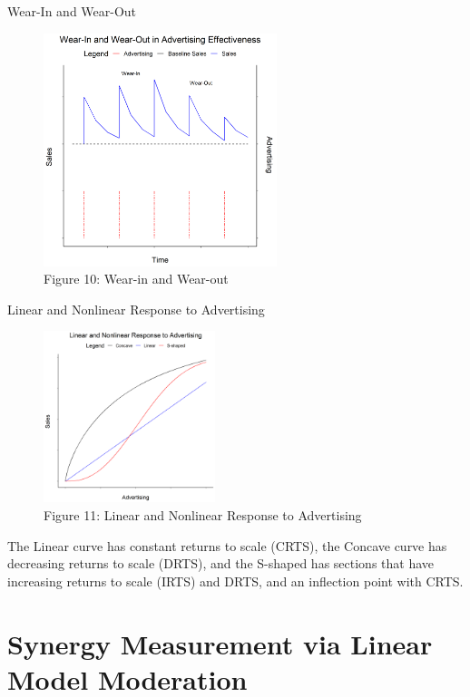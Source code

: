 \documentclass[pdf]{beamer}
\theoremstyle{remark}
\theoremstyle{definition}
\begin{document}
\begin{frame}[t]{Wear-In and Wear-Out}
\begin{figure}[htbp]
  \captionsetup{justification=centering}
  \includegraphics[height=6.8cm, trim=0.3cm 0.3cm 0.3cm 0.3cm width=6.8cm]{../BUSA_603_Ad_Response/Output/m5_5.png}
  \caption{Figure {\color{franklinblue} 10}: Wear-in and Wear-out}
\end{figure}
\end{frame}


\begin{frame}[t]{Linear and Nonlinear Response to Advertising}
\begin{figure}[htbp]
  \captionsetup{justification=centering}
  \includegraphics[height=5.0cm, trim=0.0cm 0.0cm 0.0cm 0.0cm width=5.0cm]{../BUSA_603_Ad_Response/Output/m5_a.png}
  \caption{Figure {\color{franklinblue} 11}: Linear and Nonlinear Response to Advertising}
\end{figure}
\vspace{-1.0ex}
\small
The Linear curve has constant returns to scale (CRTS), the Concave curve has decreasing returns to scale (DRTS), and the S-shaped has sections that have increasing returns to scale (IRTS) and DRTS, and an inflection point with CRTS.
\end{frame}

\section{Synergy Measurement via Linear Model Moderation}
\end{document}

